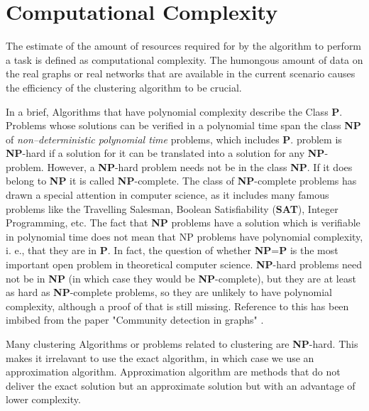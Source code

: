 \section{Computational Complexity}
 The estimate of the amount of resources required for by the algorithm to perform a task is defined as computational complexity. The humongous amount of data on the real graphs or real networks that are available in the current scenario causes the efficiency of the clustering algorithm to be crucial.
\par In a brief, Algorithms that have polynomial complexity describe the Class \textbf{P}. Problems whose solutions can be verified in a polynomial time span the class \textbf{NP} of \textit{non--deterministic polynomial time} problems, which includes \textbf{P}. problem is \textbf{NP}-hard if a solution for it can be
translated into a solution for any \textbf{NP}-problem. However,
a \textbf{NP}-hard problem needs not be in the class \textbf{NP}. If it
does belong to \textbf{NP} it is called \textbf{NP}-complete. The class
of \textbf{NP}-complete problems has drawn a special attention
in computer science, as it includes many famous problems like the Travelling Salesman, Boolean Satisfiability
(\textbf{SAT}), Integer Programming, etc.
The fact that \textbf{NP} problems have a solution which is verifiable in polynomial
time does not mean that NP problems have polynomial
complexity, i. e., that they are in \textbf{P}. In fact, the question of whether \textbf{NP}=\textbf{P} is the most important open problem in theoretical computer science. \textbf{NP}-hard problems
need not be in \textbf{NP} (in which case they would be \textbf{NP}-complete), but they are at least as hard as \textbf{NP}-complete
problems, so they are unlikely to have polynomial complexity, although a proof of that is still missing. Reference to this has been imbibed from the paper "Community detection in graphs" \cite{communitypaper}.
\par Many clustering Algorithms or problems related to clustering are \textbf{NP}-hard. This makes it irrelavant to use the exact algorithm, in which case we use an approximation algorithm. Approximation algorithm are methods that do not deliver the exact solution but an approximate solution but with an advantage of lower complexity. \cite{communitypaper}

